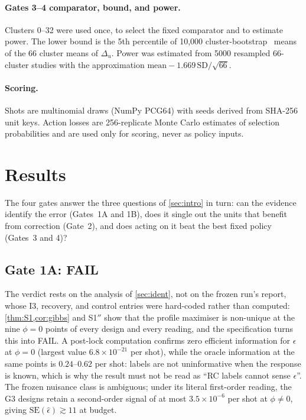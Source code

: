 \documentclass[10pt,twocolumn]{article}
\theoremstyle{definition}
\theoremstyle{remark}
\newcommand{\eps}{\epsilon}
\begin{document}
\paragraph{Gates 3--4 comparator, bound, and power.} Clusters 0--32 were used once, to select the fixed comparator and to estimate power. The lower bound is the 5th percentile of 10{,}000 cluster-bootstrap~\cite{efron1979} means of the 66 cluster means of $\Delta_u$. Power was estimated from 5000 resampled 66-cluster studies with the approximation $\text{mean}-1.669\,\mathrm{SD}/\sqrt{66}$.

\paragraph{Scoring.} Shots are multinomial draws (NumPy PCG64) with seeds derived from SHA-256 unit keys. Action losses are 256-replicate Monte Carlo estimates of selection probabilities and are used only for scoring, never as policy inputs.

\section{Results}\label{sec:results}

The four gates answer the three questions of \cref{sec:intro} in turn: can the evidence identify the error (Gates~1A and 1B), does it single out the units that benefit from correction (Gate~2), and does acting on it beat the best fixed policy (Gates~3 and 4)?

\subsection{Gate 1A: FAIL}
The verdict rests on the analysis of \cref{sec:ident}, not on the frozen run's report, whose I3, recovery, and control entries were hard-coded rather than computed: \cref{thm:S1,cor:gibbs} and S1$''$ show that the profile maximiser is non-unique at the nine $\phi=0$ points of every design and every reading, and the specification turns this into FAIL. A post-lock computation confirms zero efficient information for $\eps$ at $\phi=0$ (largest value $6.8\times10^{-21}$ per shot), while the oracle information at the same points is $0.24$--$0.62$ per shot: labels are not uninformative when the response is known, which is why the result must not be read as ``RC labels cannot sense $\eps$''. The frozen nuisance class is ambiguous; under its literal first-order reading, the G3 designs retain a second-order signal of at most $3.5\times10^{-6}$ per shot at $\phi\neq0$, giving $\mathrm{SE}(\hat\eps)\gtrsim11$ at budget.
\end{document}
